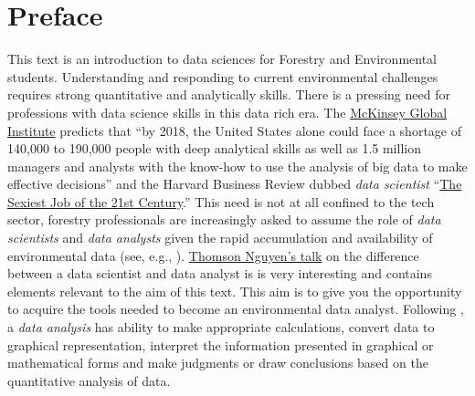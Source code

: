 \usepackage{Sweave}


\chapter*{Preface}
This text is an introduction to data sciences for Forestry and Environmental students. Understanding and responding to current environmental challenges requires strong quantitative and analytically skills. There is a pressing need for professions with data science skills in this data rich era. The \href{http://www.mckinsey.com/insights/business_technology/big_data_the_next_frontier_for_innovation}{McKinsey Global Institute} predicts that ``by 2018, the United States alone could face a shortage of 140,000 to 190,000 people with deep analytical skills as well as 1.5 million managers and analysts with the know-how to use the analysis of big data to make effective decisions'' and the Harvard Business Review dubbed \emph{data scientist} ``\href{https://hbr.org/2012/10/data-scientist-the-sexiest-job-of-the-21st-century}{The Sexiest Job of the 21st Century}.''  This need is not at all confined to the tech sector, forestry professionals are increasingly asked to assume the role of \emph{data scientists} and \emph{data analysts} given the rapid accumulation and availability of environmental data (see, e.g., \citet{Schimel2015}). \href{www.import.io/post/data-scientists-vs-data-analysts-why-the-distinction-matters}{Thomson Nguyen's talk} on the difference between a data scientist and data analyst is is very interesting and contains elements relevant to the aim of this text. This aim is to give you the opportunity to acquire the tools needed to become an environmental data analyst. Following \citet{Bravo16}, a \emph{data analysis} has ability to make appropriate calculations, convert data to graphical representation, interpret the information presented in graphical or mathematical forms and make judgments or draw conclusions based on the quantitative analysis of data.

